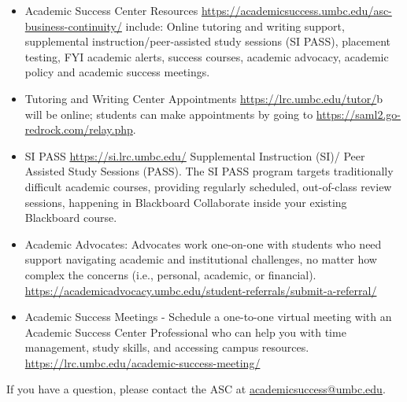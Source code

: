 \documentclass[letter,10pt]{article}
\begin{document}
\begin{itemize}
\item Academic Success Center Resources \url{https://academicsuccess.umbc.edu/asc-business-continuity/} include: Online tutoring and writing support, supplemental instruction/peer-assisted study sessions (SI PASS), placement testing, FYI academic alerts, success courses, academic advocacy, academic policy and academic success meetings.

\item Tutoring and Writing Center Appointments \url{https://lrc.umbc.edu/tutor/}b will be online; students can make appointments by going to \url{https://saml2.go-redrock.com/relay.php}.

\item SI PASS \url{https://si.lrc.umbc.edu/} Supplemental Instruction (SI)/ Peer Assisted Study Sessions (PASS). The SI PASS program targets traditionally difficult academic courses, providing regularly scheduled, out-of-class review sessions, happening in Blackboard Collaborate inside your existing Blackboard course.

\item Academic Advocates: Advocates work one-on-one with students who need support navigating academic and institutional challenges, no matter how complex the concerns (i.e., personal, academic, or financial). \url{https://academicadvocacy.umbc.edu/student-referrals/submit-a-referral/}

\item Academic Success Meetings - Schedule a one-to-one virtual meeting with an Academic Success Center Professional who can help you with time management, study skills, and accessing campus resources. \url{https://lrc.umbc.edu/academic-success-meeting/}

\end{itemize}

If you have a question, please contact the ASC at \href{mailto:academicsuccess@umbc.edu}{academicsuccess@umbc.edu}.
\end{document}
